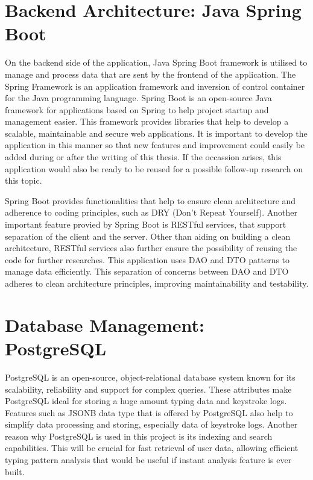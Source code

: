 \section{Backend Architecture: Java Spring Boot}
On the backend side of the application, Java Spring Boot framework is utilised to manage and process data that are sent by the frontend of the application.
The Spring Framework is an application framework and inversion of control container for the Java programming language.
Spring Boot is an open-source Java framework for applications based on Spring to help project startup and management easier.
This framework provides libraries that help to develop a scalable, maintainable and secure web applications.
It is important to develop the application in this manner so that new features and improvement could easily be added during or after the writing of this thesis.
If the occassion arises, this application would also be ready to be reused for a possible follow-up research on this topic.

Spring Boot provides functionalities that help to ensure clean architecture and adherence to coding principles, such as DRY (Don't Repeat Yourself).
Another important feature provied by Spring Boot is RESTful services, that support separation of the client and the server.
Other than aiding on building a clean architecture, RESTful services also further ensure the possibility of reusing the code for further researches.
This application uses \ac{DAO} and \ac{DTO} patterns to manage data efficiently.
This separation of concerns between \ac{DAO} and \ac{DTO} adheres to clean architecture principles, improving maintainability and testability.

\section{Database Management: PostgreSQL}
PostgreSQL is an open-source, object-relational database system known for its scalability, reliability and support for complex queries.
These attributes make PostgreSQL ideal for storing a huge amount typing data and keystroke logs.
Features such as JSONB data type that is offered by PostgreSQL also help to simplify data processing and storing, especially data of keystroke logs. 
Another reason why PostgreSQL is used in this project is its indexing and search capabilities.
This will be crucial for fast retrieval of user data, allowing efficient typing pattern analysis that would be useful if instant analysis feature is ever built.

